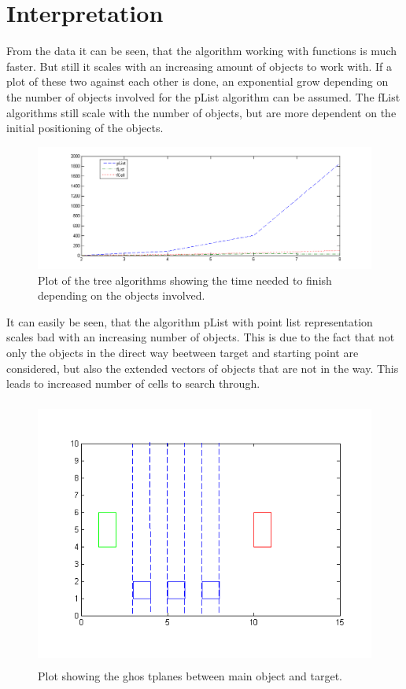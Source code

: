 \section{Interpretation}
From the data it can be seen, that the algorithm working with functions is much faster. But still it scales with an increasing amount of objects to work with.
If a plot of these two against each other is done, an exponential grow depending on the number of objects involved for the pList algorithm can be assumed.
The fList algorithms still scale with the number of objects, but are more dependent on the initial positioning of the objects.
\begin{figure}[H]
\includegraphics[width=\textwidth]{pointAgainstFuncAgainstCell.png}
\caption{ Plot of the tree algorithms showing the time needed to finish depending on the objects involved.}
\end{figure}
It can easily be seen, that the algorithm pList with point list representation scales bad with an increasing number of objects. This is due to the fact that not only the objects in the direct way beetween target and starting point are considered, but also the extended vectors of objects that are not in the way. This leads to increased number of cells to search through.
\begin{figure}[H]
\centering
\includegraphics[width=\textwidth, height=250pt]{ghostplanesStep}
\caption{Plot showing the ghos tplanes between main object and target.}
\end{figure}
